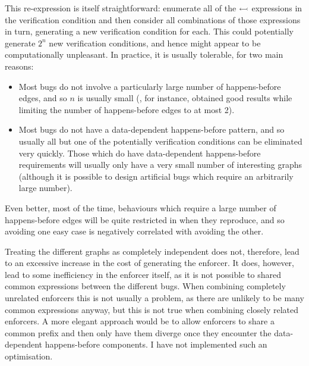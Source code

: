 This re-expression is itself straightforward: enumerate all of the
$\leftarrowtail$ expressions in the verification condition and
then consider all combinations of those expressions in turn,
generating a new verification condition for each.  This could
potentially generate $2^n$ new verification conditions, and hence
might appear to be computationally unpleasant.  In practice, it is
usually tolerable, for two main reasons:

\begin{itemize}
\item
  Most bugs do not involve a particularly large number of
  happens-before edges, and so $n$ is usually small (, for instance, obtained good
  results while limiting the number of happens-before edges to at most
  2).
\item
  Most bugs do not have a data-dependent happens-before pattern, and
  so usually all but one of the potentially verification conditions
  can be eliminated very quickly.  Those which do have data-dependent
  happens-before requirements will usually only have a very small
  number of interesting graphs (although it is possible to design
  artificial bugs which require an arbitrarily large number).
\end{itemize}

Even better, most of the time, behaviours which require a large number
of happens-before edges will be quite restricted in when they
reproduce, and so avoiding one easy case is negatively correlated with
avoiding the other.


Treating the different graphs as completely independent does not,
therefore, lead to an excessive increase in the cost of generating the
enforcer.  It does, however, lead to some inefficiency in the enforcer
itself, as it is not possible to shared common expressions between the
different bugs.  When combining completely unrelated enforcers this is
not usually a problem, as there are unlikely to be many common
expressions anyway, but this is not true when combining closely
related enforcers.  A more elegant approach would be to allow
enforcers to share a common prefix and then only have them diverge
once they encounter the data-dependent happens-before components.  I
have not implemented such an optimisation.

